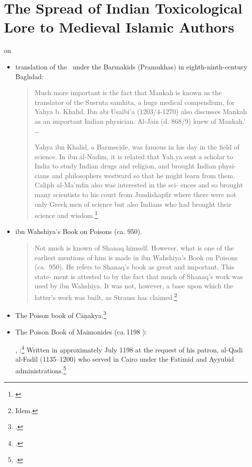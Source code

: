 \section{The Spread of Indian Toxicological Lore to Medieval Islamic 
Authors}

\citet[Introduction]{leve-1966} on 
\begin{itemize}
    \item translation of the \SS\ under the Barmakids (Pramukhas) in 
    eighth-ninth-century Baghdad:
    \begin{quote}
        Much more important is the fact
        that Mankah is known as the translator of the Susruta
        samhita, a huge medical compendium, for Yahya b.
        Khalid. Ibn abi Usaibi'a (1203/4-1270) also discusses
        Mankah as an important Indian physician. Al-Jaiz
        (d. 868/9) knew of Mankah.'
        \ldots
        
        Yahya ibn Khalid, a Barmecide, was famous in his
        day in the field of science. In ibn al-Nadim, it is
        related that Yah.ya sent a scholar to India to study
        Indian drugs and religion, and brought Indian physi-
        cians and philosophers westward so that he might learn
        from them.
        Caliph al-Ma'mfin  also was interested in the sci-
        ences and so brought many scientists to his court from
        Jundishapfir where there were not only Greek men of
        science but also Indians who had brought their science
        and wisdom.\footnote{\cite[6]{leve-1966}}
    \end{quote}
    
    \item ibn Wahshiya's Book on Poisons (ca. 950). 
    \begin{quote}
        Not much is known of Shanaq himself. However,
        what is one of the earliest mentions of him is made in
        ibn Wahshiya's Book on Poisons (ca.\ 950). He refers
        to Shanaq's book as great and important. This state-
        ment is attested to by the fact that much of Shanaq's
        work was used by ibn Wahshiya. It was not, however,
        a base upon which the latter's work was built, as
        Strauss has claimed.\footnote{Idem.}
    \end{quote}
    \item The Poison book of Cāṇakya.\footcite{stra-1934}

\item The Poison Book of Maimonides (ca.\,1198 \CE):

\citeauthor{rosn-1968},
:\footcite{rosn-1968}  Written in
approximately July 1198 at the request of his patron, al-Qadi
al-Fadil (1135--1200) who served in Cairo under the Fatimid and
Ayyubid administrations.\footcite[31]{krae-2005}
\end{itemize}
